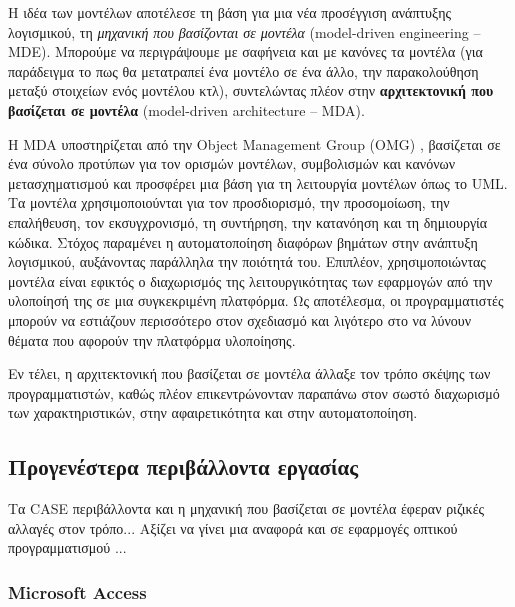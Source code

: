             Η ιδέα των μοντέλων αποτέλεσε τη βάση για μια νέα προσέγγιση ανάπτυξης λογισμικού, τη \textit{μηχανική που βασίζονται σε μοντέλα} (model-driven engineering -- MDE). Μπορούμε να περιγράψουμε με σαφήνεια και με κανόνες τα μοντέλα (για παράδειγμα το πως θα μετατραπεί ένα μοντέλο σε ένα άλλο, την παρακολούθηση μεταξύ στοιχείων ενός μοντέλου κτλ), συντελώντας πλέον στην \textbf{αρχιτεκτονική που βασίζεται σε μοντέλα} (model-driven architecture -- MDA).

            Η MDA υποστηρίζεται από την Object Management Group (OMG) \cite{OMG_MDA}, βασίζεται σε ένα σύνολο προτύπων για τον ορισμών μοντέλων, συμβολισμών και κανόνων μετασχηματισμού και προσφέρει μια βάση για τη λειτουργία μοντέλων όπως το UML. Τα μοντέλα χρησιμοποιούνται για τον προσδιορισμό, την προσομοίωση, την επαλήθευση, τον εκσυγχρονισμό, τη συντήρηση, την κατανόηση και τη δημιουργία κώδικα. Στόχος παραμένει η αυτοματοποίηση διαφόρων βημάτων στην ανάπτυξη λογισμικού, αυξάνοντας παράλληλα την ποιότητά του. Επιπλέον, χρησιμοποιώντας μοντέλα είναι εφικτός ο διαχωρισμός της λειτουργικότητας των εφαρμογών από την υλοποίησή της σε μια συγκεκριμένη πλατφόρμα. Ως αποτέλεσμα, οι προγραμματιστές μπορούν να εστιάζουν περισσότερο στον σχεδιασμό και λιγότερο στο να λύνουν θέματα που αφορούν την πλατφόρμα υλοποίησης.

            Εν τέλει, η αρχιτεκτονική που βασίζεται σε μοντέλα άλλαξε τον τρόπο σκέψης των προγραμματιστών, καθώς πλέον επικεντρώνονταν παραπάνω στον σωστό διαχωρισμό των χαρακτηριστικών, στην αφαιρετικότητα και στην αυτοματοποίηση.
            \cite{Bucaioni2022, MDELow, MDSDSpringer}

        \subsection{Προγενέστερα περιβάλλοντα εργασίας}
            Τα CASE περιβάλλοντα και η μηχανική που βασίζεται σε μοντέλα έφεραν ριζικές αλλαγές στον τρόπο...
            Αξίζει να γίνει μια αναφορά και σε εφαρμογές οπτικού προγραμματισμού ...

            \subsubsection{Microsoft Access}

